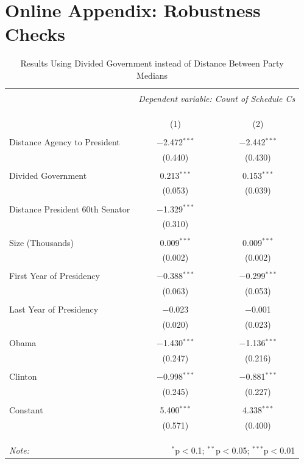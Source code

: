 \documentclass[12pt]{article}
\begin{document}
\newpage
\section*{Online Appendix: Robustness Checks}
\begin{table}[!htbp] \centering 
  \caption{Results Using Divided Government instead of Distance Between Party Medians} 
  \label{} 
\begin{tabular}{@{\extracolsep{5pt}}lcc} 
\\[-1.8ex]\hline 
\hline \\[-1.8ex] 
 & \multicolumn{2}{c}{\textit{Dependent variable: Count of Schedule Cs}} \\ 
\cline{2-3} 
\\[-1.8ex] & \multicolumn{2}{c}{ } \\ 
\\[-1.8ex] & (1) & (2)\\ 
\hline \\[-1.8ex] 
 Distance Agency to President & $-$2.472$^{***}$ & $-$2.442$^{***}$ \\ 
  & (0.440) & (0.430) \\ 
  & & \\ 
 Divided Government& 0.213$^{***}$ & 0.153$^{***}$ \\ 
  & (0.053) & (0.039) \\ 
  & & \\ 
 Distance President 60th Senator & $-$1.329$^{***}$ &  \\ 
  & (0.310) &  \\ 
  & & \\ 
 Size (Thousands) & 0.009$^{***}$ & 0.009$^{***}$ \\ 
  & (0.002) & (0.002) \\ 
  & & \\ 
 First Year of Presidency & $-$0.388$^{***}$ & $-$0.299$^{***}$ \\ 
  & (0.063) & (0.053) \\ 
  & & \\ 
 Last Year of Presidency & $-$0.023 & $-$0.001 \\ 
  & (0.020) & (0.023) \\ 
  & & \\ 
 Obama & $-$1.430$^{***}$ & $-$1.136$^{***}$ \\ 
  & (0.247) & (0.216) \\ 
  & & \\ 
 Clinton & $-$0.998$^{***}$ & $-$0.881$^{***}$ \\ 
  & (0.245) & (0.227) \\ 
  & & \\ 
 Constant & 5.400$^{***}$ & 4.338$^{***}$ \\ 
  & (0.571) & (0.400) \\ 
  & & \\ 
\hline \\[-1.8ex] 
\hline 
\hline \\[-1.8ex] 
\textit{Note:}  & \multicolumn{2}{r}{$^{*}$p$<$0.1; $^{**}$p$<$0.05; $^{***}$p$<$0.01} \\ 
\end{tabular} 
\end{table}
\end{document}
